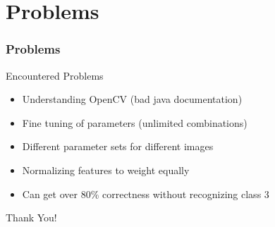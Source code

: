 \documentclass{beamer}
\begin{document}
\section{Problems}
\begin{frame}
	\frametitle{Problems}
	\begin{block}{Encountered Problems}
		\begin{itemize}
            \item Understanding OpenCV (bad java documentation)
			\item Fine tuning of parameters (unlimited combinations)
			\item Different parameter sets for different images
			\item Normalizing features to weight equally
            \item Can get over 80\% correctness without recognizing class 3
		\end{itemize}
	\end{block}
\end{frame}

\begin{frame}
	\begin{center}
        \Huge Thank You!\\
    \end{center}
\end{frame}
\end{document}
